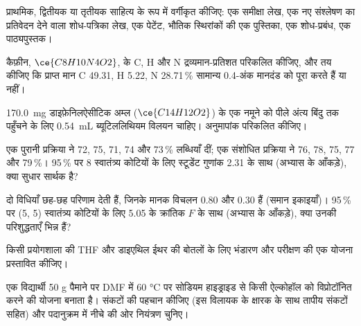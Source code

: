 \begin{exercise}[$\star$]\label{exo:b3:lab-techniques-3:4}
प्राथमिक, द्वितीयक या तृतीयक साहित्य के रूप में वर्गीकृत कीजिए: एक समीक्षा लेख, एक
नए संश्लेषण का प्रतिवेदन देने वाला शोध-पत्रिका लेख, एक पेटेंट, भौतिक
स्थिरांकों की एक पुस्तिका, एक शोध-प्रबंध, एक पाठ्यपुस्तक।
\end{exercise}

\begin{exercise}[$\star\star$]\label{exo:b3:lab-techniques-3:5}
कैफ़ीन, $\ce{C8H10N4O2}$, के C, H और N द्रव्यमान-प्रतिशत परिकलित कीजिए, और तय कीजिए कि प्राप्त
मान C 49.31, H 5.22, N 28.71\,\% सामान्य 0.4-अंक मानदंड को पूरा करते हैं या नहीं।
\end{exercise}

\begin{exercise}[$\star\star$]\label{exo:b3:lab-techniques-3:6}
\qty{170.0}{mg} डाइफ़ेनिलऐसीटिक अम्ल ($\ce{C14H12O2}$) के एक नमूने को पीले अंत्य बिंदु तक पहुँचने के लिए \qty{0.54}{mL} ब्यूटिललिथियम विलयन
चाहिए। अनुमापांक परिकलित कीजिए।
\end{exercise}

\begin{exercise}[$\star\star$]\label{exo:b3:lab-techniques-3:7}
एक पुरानी प्रक्रिया ने 72, 75, 71, 74 और 73\,\% लब्धियाँ दीं; एक संशोधित प्रक्रिया ने 76, 78, 75, 77 और
79\,\%। 95\,\% पर 8 स्वातंत्र्य कोटियों के लिए स्टूडेंट गुणांक 2.31 के साथ (अभ्यास के आँकड़े),
क्या सुधार सार्थक है?
\end{exercise}

\begin{exercise}[$\star\star$]\label{exo:b3:lab-techniques-3:8}
दो विधियाँ छह-छह परिणाम देती हैं, जिनके मानक विचलन 0.80 और 0.30 हैं (समान
इकाइयाँ)। 95\,\% पर (5, 5) स्वातंत्र्य कोटियों के लिए 5.05 के क्रांतिक $F$ के साथ (अभ्यास के
आँकड़े), क्या उनकी परिशुद्धताएँ भिन्न हैं?
\end{exercise}

\begin{exercise}[$\star\star$]\label{exo:b3:lab-techniques-3:9}
किसी प्रयोगशाला की THF और डाइएथिल ईथर की बोतलों के लिए भंडारण और परीक्षण की एक योजना
प्रस्तावित कीजिए।
\end{exercise}

\begin{exercise}[$\star\star\star$]\label{exo:b3:lab-techniques-3:10}
एक विद्यार्थी 50 g पैमाने पर DMF में 60 °C पर सोडियम हाइड्राइड से किसी ऐल्कोहॉल को
विप्रोटॉनित करने की योजना बनाता है। संकटों की पहचान कीजिए (इस विलायक के
क्षारक के साथ तापीय संकटों सहित) और पदानुक्रम में नीचे की ओर नियंत्रण चुनिए।
\end{exercise}

